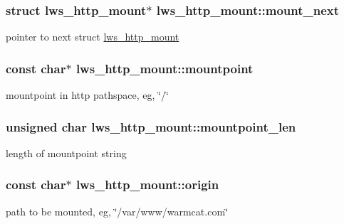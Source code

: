 \subsubsection[{\texorpdfstring{mount\+\_\+next}{mount\_next}}]{\setlength{\rightskip}{0pt plus 5cm}struct {\bf lws\+\_\+http\+\_\+mount}$\ast$ lws\+\_\+http\+\_\+mount\+::mount\+\_\+next}\hypertarget{structlws__http__mount_ad878546ae1c399bbca7d7f8a0baf973d}{}\label{structlws__http__mount_ad878546ae1c399bbca7d7f8a0baf973d}
pointer to next struct \hyperlink{structlws__http__mount}{lws\+\_\+http\+\_\+mount} 
\subsubsection[{\texorpdfstring{mountpoint}{mountpoint}}]{\setlength{\rightskip}{0pt plus 5cm}const char$\ast$ lws\+\_\+http\+\_\+mount\+::mountpoint}\hypertarget{structlws__http__mount_aa2391bfcada0b7a290b3c6651f64586c}{}\label{structlws__http__mount_aa2391bfcada0b7a290b3c6651f64586c}
mountpoint in http pathspace, eg, \char`\"{}/\char`\"{} 
\subsubsection[{\texorpdfstring{mountpoint\+\_\+len}{mountpoint\_len}}]{\setlength{\rightskip}{0pt plus 5cm}unsigned char lws\+\_\+http\+\_\+mount\+::mountpoint\+\_\+len}\hypertarget{structlws__http__mount_ac8489b60b8f969eb19c9abbdeac90743}{}\label{structlws__http__mount_ac8489b60b8f969eb19c9abbdeac90743}
length of mountpoint string 
\subsubsection[{\texorpdfstring{origin}{origin}}]{\setlength{\rightskip}{0pt plus 5cm}const char$\ast$ lws\+\_\+http\+\_\+mount\+::origin}\hypertarget{structlws__http__mount_a21d86fd6043ec00e121ababbc29af39a}{}\label{structlws__http__mount_a21d86fd6043ec00e121ababbc29af39a}
path to be mounted, eg, \char`\"{}/var/www/warmcat.\+com\char`\"{} 
